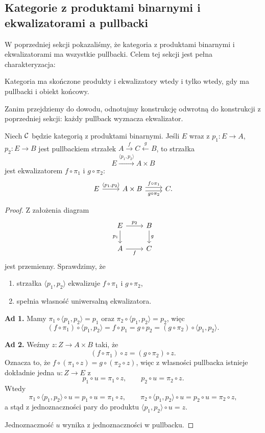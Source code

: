 \subsection*{Kategorie z produktami binarnymi i ekwalizatorami a pullbacki}

W poprzedniej sekcji pokazaliśmy, że kategoria z produktami binarnymi i ekwalizatorami ma wszystkie pullbacki. Celem tej sekcji jest pełna charakteryzacja:

\begin{twierdzenie}\label{tw:pullbacki-charakteryzacja}
Kategoria ma skończone produkty i ekwalizatory wtedy i tylko wtedy, gdy ma pullbacki i obiekt końcowy.
\end{twierdzenie}

Zanim przejdziemy do dowodu, odnotujmy konstrukcję odwrotną do konstrukcji z poprzedniej sekcji: każdy pullback wyznacza ekwalizator.

\begin{stwierdzenie}\label{stw:pullback-daje-ekwalizator}
Niech $\mathcal{C}$ będzie kategorią z produktami binarnymi. Jeśli $E$ wraz z $p_1\colon E\to A$, $p_2\colon E\to B$ jest pullbackiem strzałek $A \xrightarrow{f} C \xleftarrow{g} B$, to strzałka
\[
E \xrightarrow{\langle p_1,p_2\rangle} A\times B
\]
jest ekwalizatorem $f\circ \pi_1$ i $g\circ \pi_2$:
\[
\begin{tikzcd}
E \arrow[r,"{\langle p_1,p_2\rangle}"] & A\times B \arrow[r, shift left,"f\circ\pi_1"] \arrow[r, shift right,"g\circ\pi_2"'] & C.
\end{tikzcd}
\]
\end{stwierdzenie}

\begin{proof}
Z założenia diagram
\[
\begin{tikzcd}
E \arrow[r,"p_2"] \arrow[d,"p_1"'] & B \arrow[d,"g"] \\
A \arrow[r,"f"'] & C
\end{tikzcd}
\]
jest przemienny. Sprawdzimy, że
\begin{enumerate}
  \item strzałka $\langle p_1,p_2\rangle$ ekwalizuje $f\circ \pi_1$ i $g\circ \pi_2$,
  \item spełnia własność uniwersalną ekwalizatora.
\end{enumerate}

\textbf{Ad 1.} Mamy $\pi_1\circ \langle p_1,p_2\rangle = p_1$ oraz $\pi_2\circ \langle p_1,p_2\rangle = p_2$, więc
\[
(f\circ\pi_1)\circ\langle p_1,p_2\rangle = f\circ p_1 = g\circ p_2 = (g\circ\pi_2)\circ\langle p_1,p_2\rangle.
\]

\textbf{Ad 2.} Weźmy $z\colon Z\to A\times B$ taki, że
\[
(f\circ\pi_1)\circ z = (g\circ\pi_2)\circ z.
\]
Oznacza to, że $f\circ(\pi_1\circ z) = g\circ(\pi_2\circ z)$, więc z własności pullbacka istnieje dokładnie jedna $u\colon Z\to E$ z
\[
p_1\circ u = \pi_1\circ z, \qquad p_2\circ u = \pi_2\circ z.
\]
Wtedy
\[
\pi_1\circ\langle p_1,p_2\rangle\circ u = p_1\circ u = \pi_1\circ z, \qquad \pi_2\circ\langle p_1,p_2\rangle\circ u = p_2\circ u = \pi_2\circ z,
\]
a stąd z jednoznaczności pary do produktu $\langle p_1,p_2\rangle\circ u = z$.

Jednoznaczność $u$ wynika z jednoznaczności w pullbacku.
\end{proof}

